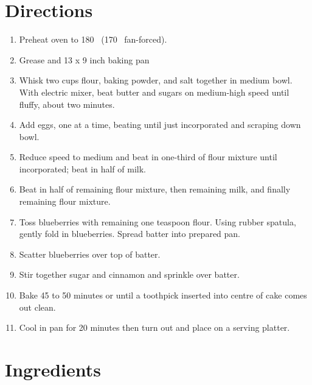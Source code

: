 \section*{Directions}
\begin{enumerate}
	\item Preheat oven to 180 \textcelsius\ (170 \textcelsius\  fan-forced).
	\item Grease and 13 x 9 inch baking pan
	\item Whisk two cups flour, baking powder, and salt together in medium bowl.
		With electric mixer, beat butter and sugars on medium-high speed until fluffy, about two minutes. 
	\item Add eggs, one at a time, beating until just incorporated and scraping down bowl.
	\item Reduce speed to medium and beat in one-third of flour mixture until incorporated; beat in half of milk.
	\item Beat in half of remaining flour mixture, then remaining milk, and finally remaining flour mixture.
	\item Toss blueberries with remaining one teaspoon flour. Using rubber spatula, gently fold in blueberries.
		Spread batter into prepared pan.
	\item Scatter blueberries over top of batter.
	\item Stir together sugar and cinnamon and sprinkle over batter.
	\item Bake 45 to 50 minutes or until a toothpick inserted into centre of cake comes out clean.
	\item Cool in pan for 20 minutes then turn out and place on a serving platter.
\end{enumerate}


\bigskip
\section*{Ingredients}

